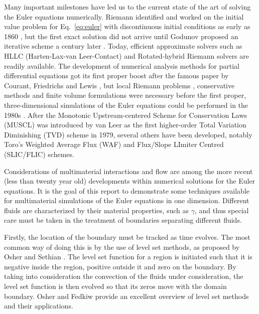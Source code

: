 \documentclass[final,3p,twocolumn,times]{elsarticle}
\begin{document}
Many important milestones have led us to the current state of the art of
solving the Euler equations numerically. Riemann identified and worked on the
initial value problem for Eq.\ \eqref{eq:euler} with discontinuous initial
conditions as early as 1860 \cite{riemann1860fortpflanzung}, but the first
exact solution did not arrive until Godunov proposed an iterative scheme a
century later \cite{godunov1959difference}. Today, efficient approximate
solvers such as HLLC (Harten-Lax-van Leer-Contact) \cite{toro1994restoration}
and Rotated-hybrid Riemann solvers \cite{nishikawa2008very} are readily
available. The development of numerical analysis methods for partial
differential equations got its first proper boost after the famous paper by
Courant, Friedrichs and Lewis \cite{courant1928partiellen}, but local Riemann
problems \cite{godunov1959difference}, conservative methods
\cite{lax1960systems} and finite volume formulations \cite{leveque2002finite}
were necessary before the first proper, three-dimensional simulations of the
Euler equations could be performed in the 1980s \cite{jameson1981numerical}.
After the Monotonic Upstream-centered Scheme for Conservation Laws (MUSCL)
\cite{van1979towards} was introduced by van Leer as the first higher-order
Total Variation Diminishing (TVD) scheme in 1979, several others have been
developed, notably Toro's Weighted Average Flux (WAF) \cite{toro1989weighted} and
Flux/Slope LImiter Centred (SLIC/FLIC) \cite{toro2000centred} schemes. 

Considerations of multimaterial interactions and flow are among the more recent
(less than twenty year old) developments within numerical solutions for the
Euler equations. It is the goal of this report to demonstrate some techniques
available for multimaterial simulations of the Euler equations in one
dimension. Different fluids are characterized by their material properties,
such as $\gamma$, and thus special care must be taken in the treatment of
boundaries separating different fluids. 

Firstly, the location of the boundary must be tracked as time evolves. The most
common way of doing this is by the use of level set methods, as proposed by
Osher and Sethian \cite{osher1988fronts}. The level set function for a region
is initiated such that it is negative inside the region, positive outside it
and zero on the boundary. By taking into consideration the convection of the
fluids under consideration, the level set function is then evolved so that its
zeros move with the domain boundary. Osher and Fedkiw \cite{osher2001level}
provide an excellent overview of level set methods and their applications. 
\end{document}
